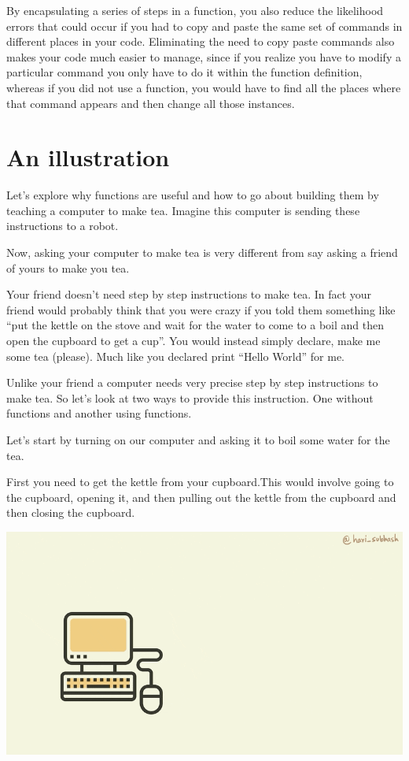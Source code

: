 \documentclass[
]{book}
\begin{document}
By encapsulating a series of steps in a function, you also reduce the likelihood errors that could occur if you had to copy and paste the same set of commands in different places in your code. Eliminating the need to copy paste commands also makes your code much easier to manage, since if you realize you have to modify a particular command you only have to do it within the function definition, whereas if you did not use a function, you would have to find all the places where that command appears and then change all those instances.

\hypertarget{an-illustration}{%
\section{An illustration}\label{an-illustration}}

Let's explore why functions are useful and how to go about building them by teaching a computer to make tea. Imagine this computer is sending these instructions to a robot.

Now, asking your computer to make tea is very different from say asking a friend of yours to make you tea.

Your friend doesn't need step by step instructions to make tea. In fact your friend would probably think that you were crazy if you told them something like ``put the kettle on the stove and wait for the water to come to a boil and then open the cupboard to get a cup''. You would instead simply declare, make me some tea (please). Much like you declared print ``Hello World'' for me.

Unlike your friend a computer needs very precise step by step instructions to make tea. So let's look at two ways to provide this instruction. One without functions and another using functions.

Let's start by turning on our computer and asking it to boil some water for the tea.

First you need to get the kettle from your cupboard.This would involve going to the cupboard, opening it, and then pulling out the kettle from the cupboard and then closing the cupboard.

\includegraphics{assets/ch_3-functions/gifs/cupboard_steps.gif}
\end{document}
